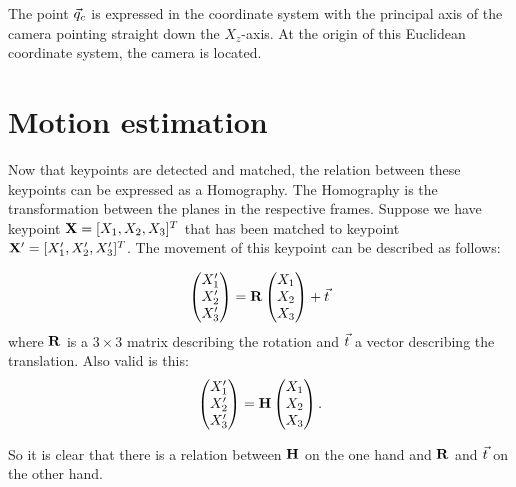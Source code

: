 The point $\vec q_c$ is expressed in the coordinate system with the principal axis of the camera pointing straight down the $X_z$-axis. At the origin of this Euclidean coordinate system, the camera is located.

\section{Motion estimation}
Now that keypoints are detected and matched, the relation between these keypoints can be expressed as a Homography. The Homography is the transformation between the planes in the respective frames. Suppose we have keypoint $\mathbf{X} = [X_1, X_2, X_3]^T$ that has been matched to keypoint $\mathbf{X}' = [X_1', X_2', X_3']^T$. The movement of this keypoint can be described as follows: 

\begin{equation} \label{eq:1}
    \begin{pmatrix}
        X_1' \\
        X_2' \\
        X_3'
    \end{pmatrix}
    = \mathbf{R}
    \begin{pmatrix}
        X_1 \\
        X_2 \\
        X_3
    \end{pmatrix}
    + \vec t
\end{equation}
where $\mathbf{R}$ is a $3 \times 3$ matrix describing the rotation and $\vec t$ a vector describing the translation. Also valid is this: 
\begin{equation}
    \begin{pmatrix}
        X_1' \\
        X_2' \\
        X_3'
    \end{pmatrix}
    = \mathbf{H}
    \begin{pmatrix}
        X_1 \\
        X_2 \\
        X_3
    \end{pmatrix}.
\end{equation} 

So it is clear that there is a relation between $\mathbf{H}$ on the one hand and $\mathbf{R}$ and $\vec t$ on the other hand.\bigskip

